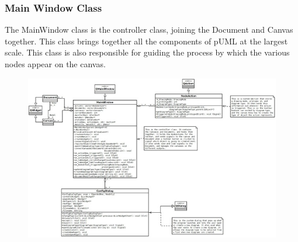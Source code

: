 \documentclass[twoside,letterpaper]{article}
\begin{document}
{\clearpage
\subsubsection[\ Main Window Class ]
{\bfseries Main Window Class }
{
The MainWindow class is the controller class, joining the Document and Canvas together. This class brings together all the components of pUML at the largest scale.  This class is also responsible for guiding the process by which the various nodes appear on the canvas.
}
  \begin{figure}[h]
  \centering
  \includegraphics[width=6.5in]{class_mainwindow.jpeg}
  \end{figure}


\clearpage
}
\end{document}
